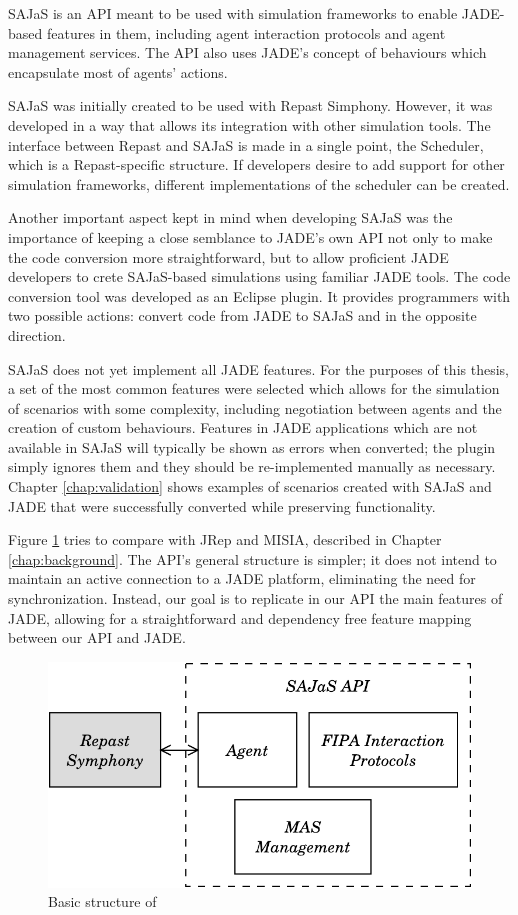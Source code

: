 SAJaS is an API meant to be used with simulation frameworks to enable JADE-based features in them, including agent interaction protocols and agent management services. The API also uses JADE's concept of behaviours which encapsulate most of agents' actions.

SAJaS was initially created to be used with Repast Simphony. However, it was developed in a way that allows its integration with other simulation tools. The interface between Repast and SAJaS is made in a single point, the Scheduler, which is a Repast-specific structure. If developers desire to add support for other simulation frameworks, different implementations of the scheduler can be created.

Another important aspect kept in mind when developing SAJaS was the importance of keeping a close semblance to JADE's own API not only to make the code  conversion more straightforward, but to allow proficient JADE developers to crete SAJaS-based simulations using familiar JADE tools. The code conversion tool was developed as an Eclipse plugin. It provides programmers with two possible actions: convert code from JADE to SAJaS and in the opposite direction.

SAJaS does not yet implement all JADE features. For the purposes of this thesis, a set of the most common features were selected which allows for the simulation of scenarios with some complexity, including negotiation between agents and the creation of custom behaviours. Features in JADE applications which are not available in SAJaS will typically be shown as errors when converted; the plugin simply ignores them and they should be re-implemented manually as necessary. Chapter \ref{chap:validation} shows examples of scenarios created with SAJaS and JADE that were successfully converted while preserving functionality.

Figure \ref{fig:related-repacl} tries to compare \apiname{} with JRep and MISIA, described in Chapter \ref{chap:background}. The API's general structure is simpler; it does not intend to maintain an active connection to a JADE platform, eliminating the need for synchronization. Instead, our goal is to replicate in our API the main features of JADE, allowing for a straightforward and dependency free feature mapping between our API and JADE.

\begin{figure}
	\centering
	\includegraphics[width=0.5\linewidth]{figures/repacl.pdf}
	\caption{Basic structure of \apiname{}}
	\label{fig:related-repacl}
\end{figure}

